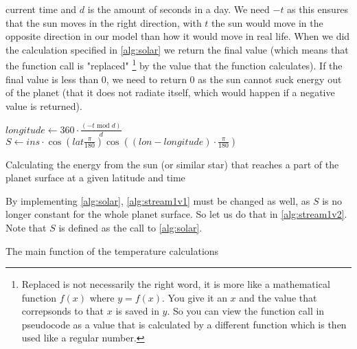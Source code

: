 current time and $d$ is the amount of seconds in a day. We need $-t$ as this ensures that the sun moves in the right direction, with $t$ the sun would move in the opposite direction in our model 
than how it would move in real life. When we did the calculation specified in \autoref{alg:solar} we return the final value (which means that the function call is "replaced" 
\footnote{Replaced is not necessarily the right word, it is more like a mathematical function $f(x)$ where $y = f(x)$. You give it an $x$ and the value that correpsonds to that $x$ is saved in 
$y$. So you can view the function call in pseudocode as a value that is calculated by a different function which is then used like a regular number.} by the value that the function calculates). 
If the final value is less than 0, we need to return 0 as the sun cannot suck energy out of the planet (that it does not radiate itself, which would happen if a negative value is returned).

\begin{algorithm}[hbt]
    \SetAlgoLined
    $longitude \leftarrow 360 \cdot \frac{(-t \text{ mod } d)}{d}$ \;
    $S \leftarrow ins \cdot \cos(lat \frac{\pi}{180}) \cos((lon - longitude) \cdot \frac{\pi}{180})$ \;
    \caption{Calculating the energy from the sun (or similar star) that reaches a part of the planet surface at a given latitude and time}
    \label{alg:solar}
\end{algorithm}

By implementing \autoref{alg:solar}, \autoref{alg:stream1v1} must be changed as well, as $S$ is no longer constant for the whole planet surface. So let us do that in \autoref{alg:stream1v2}. Note 
that $S$ is defined as the call to \autoref{alg:solar}. 
\begin{algorithm}[hbt]
    \SetAlgoLined

    \caption{The main function of the temperature calculations}
    \label{alg:stream1v2}
\end{algorithm}

